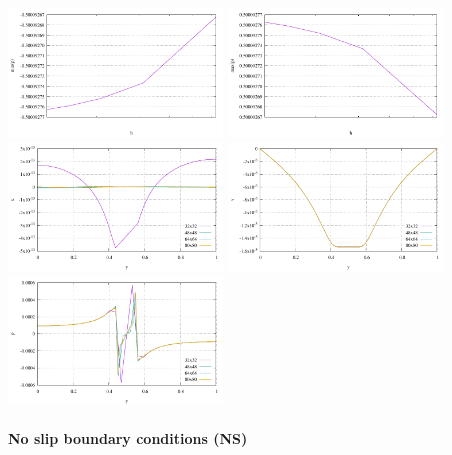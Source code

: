\begin{center}
\includegraphics[width=5.7cm]{python_codes/fieldstone_18/results/block/min_p}
\includegraphics[width=5.7cm]{python_codes/fieldstone_18/results/block/max_p}\\
\includegraphics[width=5.7cm]{python_codes/fieldstone_18/results/block/profile_u_FS}
\includegraphics[width=5.7cm]{python_codes/fieldstone_18/results/block/profile_v_FS}
\includegraphics[width=5.7cm]{python_codes/fieldstone_18/results/block/profile_p_FS}
\end{center}

\paragraph{No slip boundary conditions (NS)}



